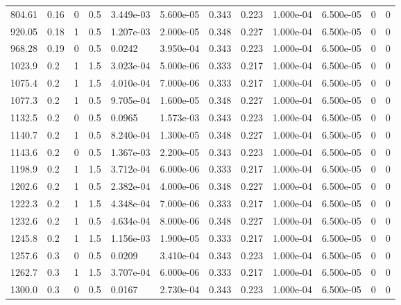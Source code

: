\documentclass[preview]{standalone}
\begin{document}
{{\begin{tabular}{L{1.2cm}C{1.2cm} C{0.3cm}C{0.5cm} C{1.4cm}C{1.4cm} C{1.4cm}C{1.4cm} C{1.6cm}C{1.6cm} C{1.6cm}C{1.6cm}}
  804.61  &  0.16  & 0     & 0.5 &  3.449e-03  & 5.600e-05  &  0.343&   0.223& 1.000e-04 & 6.500e-05   &  0 & 0  \\ 
  920.05  &  0.18  & 1     & 0.5 &  1.207e-03  & 2.000e-05  &  0.348&   0.227& 1.000e-04 & 6.500e-05   &  0 & 0  \\ 
  968.28  &  0.19  & 0     & 0.5 &  0.0242  & 3.950e-04  &  0.343&   0.223& 1.000e-04 & 6.500e-05   &  0 & 0  \\ 
  1023.9  &   0.2  & 1     & 1.5 &  3.023e-04  & 5.000e-06  &  0.333&   0.217& 1.000e-04 & 6.500e-05   &  0 & 0  \\ 
  1075.4  &   0.2  & 1     & 1.5 &  4.010e-04  & 7.000e-06  &  0.333&   0.217& 1.000e-04 & 6.500e-05   &  0 & 0  \\ 
  1077.3  &   0.2  & 1     & 0.5 &  9.705e-04  & 1.600e-05  &  0.348&   0.227& 1.000e-04 & 6.500e-05   &  0 & 0  \\ 
  1132.5  &   0.2  & 0     & 0.5 &  0.0965  & 1.573e-03  &  0.343&   0.223& 1.000e-04 & 6.500e-05   &  0 & 0  \\ 
  1140.7  &   0.2  & 1     & 0.5 &  8.240e-04  & 1.300e-05  &  0.348&   0.227& 1.000e-04 & 6.500e-05   &  0 & 0  \\ 
  1143.6  &   0.2  & 0     & 0.5 &  1.367e-03  & 2.200e-05  &  0.343&   0.223& 1.000e-04 & 6.500e-05   &  0 & 0  \\ 
  1198.9  &   0.2  & 1     & 1.5 &  3.712e-04  & 6.000e-06  &  0.333&   0.217& 1.000e-04 & 6.500e-05   &  0 & 0  \\ 
  1202.6  &   0.2  & 1     & 0.5 &  2.382e-04  & 4.000e-06  &  0.348&   0.227& 1.000e-04 & 6.500e-05   &  0 & 0  \\ 
  1222.3  &   0.2  & 1     & 1.5 &  4.348e-04  & 7.000e-06  &  0.333&   0.217& 1.000e-04 & 6.500e-05   &  0 & 0  \\ 
  1232.6  &   0.2  & 1     & 0.5 &  4.634e-04  & 8.000e-06  &  0.348&   0.227& 1.000e-04 & 6.500e-05   &  0 & 0  \\ 
  1245.8  &   0.2  & 1     & 1.5 &  1.156e-03  & 1.900e-05  &  0.333&   0.217& 1.000e-04 & 6.500e-05   &  0 & 0  \\ 
  1257.6  &   0.3  & 0     & 0.5 &  0.0209  & 3.410e-04  &  0.343&   0.223& 1.000e-04 & 6.500e-05   &  0 & 0  \\ 
  1262.7  &   0.3  & 1     & 1.5 &  3.707e-04  & 6.000e-06  &  0.333&   0.217& 1.000e-04 & 6.500e-05   &  0 & 0  \\ 
  1300.0  &   0.3  & 0     & 0.5 &  0.0167  & 2.730e-04  &  0.343&   0.223& 1.000e-04 & 6.500e-05   &  0 & 0  \\ 

\end{tabular}}}
\end{document}
